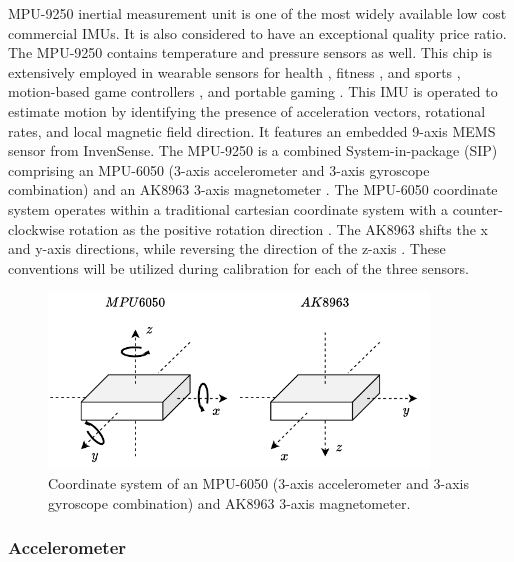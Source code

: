 MPU-9250 inertial measurement unit is one of the most widely available low cost commercial IMUs. It is also considered to have an exceptional quality price ratio. The MPU-9250 contains temperature and pressure sensors as well. This chip is extensively employed in wearable sensors for health \cite{majumder2017wearable} \cite{al2019remote}, fitness \cite{altini2016cardiorespiratory}, and sports \cite{rum2021wearable} \cite{morris2008wearable} \cite{ermes2008detection}, motion-based game controllers \cite{heinz2006using}, and portable gaming \cite{mortazavi2013near} \cite{cao2019wearable}. This IMU is operated to estimate motion by identifying the presence of acceleration vectors, rotational rates, and local magnetic field direction. It features an embedded 9-axis MEMS sensor from InvenSense. The MPU-9250 is a combined System-in-package (SIP) comprising an MPU-6050 (3-axis accelerometer and 3-axis gyroscope combination) and an AK8963 3-axis magnetometer \cite{mpu9250}. The MPU-6050 coordinate system operates within a traditional cartesian coordinate system with a counter-clockwise rotation as the positive rotation direction \cite{mpu6050}. The AK8963 shifts the x and y-axis directions, while reversing the direction of the z-axis \cite{ak8963c}. These conventions will be utilized during calibration for each of the three sensors.

\begin{figure}[!h]
    \centering
    \includegraphics[width=0.9\textwidth]{figures/mpu_orientation.pdf}
    \caption{ Coordinate system of an MPU-6050 (3-axis accelerometer and 3-axis gyroscope combination) and AK8963 3-axis magnetometer. \cite{mpu6050} \cite{ak8963c} }
    \label{fig:mpu_orientation}
\end{figure}

\subsubsection{Accelerometer}

